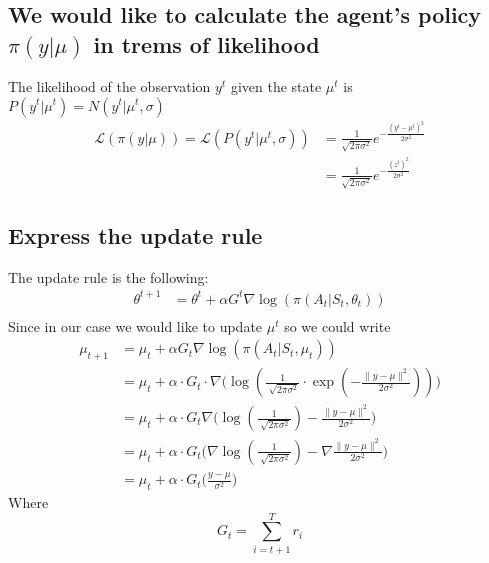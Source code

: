 \documentclass{article}
\begin{document}
    \subsection{We would like to calculate the agent's policy $\pi ( y|\mu)$ in trems of likelihood}
    The likelihood of the observation $y^t$ given the state $\mu^t$ is $P(y^t|\mu^t) = N(y^t|\mu^t,\sigma)$
    \begin{equation}
        \begin{split}
            \mathcal{L}(\pi(y|\mu)) = \mathcal{L}(P(y^t|\mu^t,\sigma)) &= \frac{1}{\sqrt{2\pi\sigma^2}}e^{-\frac{(y^t-\mu^t)^2}{2\sigma^2}}\\
            &= \frac{1}{\sqrt{2\pi\sigma^2}}e^{-\frac{(z^t)^2}{2\sigma^2}}
        \end{split} 
    \end{equation}

    \subsection{Express the update rule}
    The update rule is the following:
    \begin{equation}
        \begin{split}
            \theta^{t+1} &= \theta^t + \alpha  G^t \nabla \log(\pi(A_t|S_t,\theta_t))\\
        \end{split}
    \end{equation}
    Since in our case we would like to update $\mu^t$ so we could write
    \begin{equation}
        \begin{split}
            \mu_{t+1} &= \mu_t + \alpha  G_t \nabla \log(\pi(A_t|S_t,\mu_t))\\
            &= \mu_t + \alpha \cdot G_t \cdot \nabla\Bigg(\log(\frac{1}{\sqrt[]{2\pi\sigma^2}}\cdot \exp(-\frac{\|y-\mu\|^2}{2\sigma^2}))\Bigg) \\
            &= \mu_t + \alpha \cdot G_t  \nabla\Bigg( \log(\frac{1}{\sqrt[]{2\pi\sigma^2}}) -\frac{\|y-\mu\|^2}{2\sigma^2} \Bigg)\\
            &= \mu_t + \alpha \cdot G_t  \Bigg( \nabla\log(\frac{1}{\sqrt[]{2\pi\sigma^2}}) -\nabla \frac{\|y-\mu\|^2}{2\sigma^2} \Bigg)\\
            &= \mu_t + \alpha \cdot G_t  \Bigg(  \frac{y-\mu}{\sigma^2} \Bigg)
        \end{split}
    \end{equation}
    Where 
    \[
    G_t = \sum^T_{i=t+1} r_i
    \]
\end{document}
